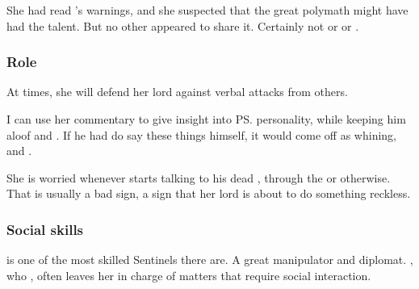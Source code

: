 She had read \Sethicus's warnings, and she suspected that the great polymath might have had the talent. 
But no other \dragon appeared to share it. 
Certainly not \Iscrafel or \Secherdamon or \Nzessuacrith. 





\subsubsection{Role}
At times, she will defend her lord against verbal attacks from others. 

I can use her commentary to give insight into \ps{\Ishnaruchaefir} personality, while keeping him aloof and . If he had do say these things himself, it would come off as whining,  and . 

She is worried whenever \Ishnaruchaefir{} starts talking to his dead \Triestessakhin, through the  or otherwise. That is usually a bad sign, a sign that her lord is about to do something reckless. 





\subsubsection{Social skills}
\Criseis{} is one of the most skilled Sentinels there are. 
A great manipulator and diplomat. 
\Ishnaruchaefir, who , often leaves her in charge of matters that require social interaction. 






